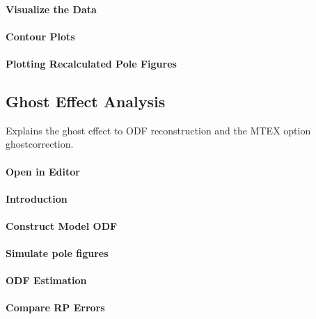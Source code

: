 \documentclass{article}
\begin{document}
			\paragraph{Visualize the Data}
		
			\paragraph{Contour Plots}
		
			\paragraph{Plotting Recalculated Pole Figures}
		
		\subsection{Ghost Effect Analysis}

		
                     \begin{par}
Explains the ghost effect to ODF reconstruction and the MTEX option ghostcorrection.
\end{par} \vspace{1em}

                  
			\paragraph{Open in Editor}
		
			\paragraph{Introduction}
		
			\paragraph{Construct Model ODF}
		
			\paragraph{Simulate pole figures}
		
			\paragraph{ODF Estimation}
		
			\paragraph{Compare RP Errors}
		
\end{document}
